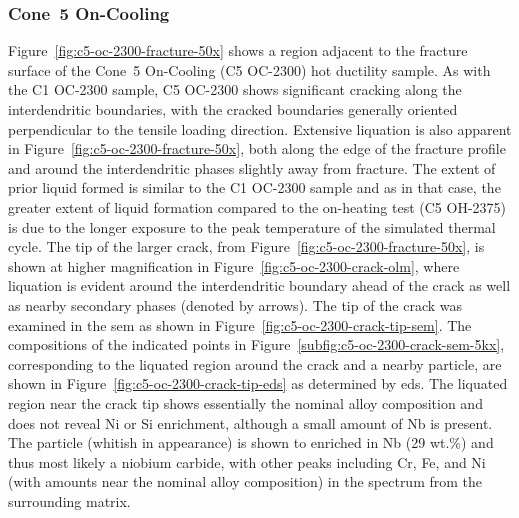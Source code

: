 {\subsubsection{Cone~5 On-Cooling}
Figure~\ref{fig:c5-oc-2300-fracture-50x} shows a region adjacent to the fracture surface of the Cone~5 On-Cooling  (C5 OC-2300) hot ductility sample. As with the C1 OC-2300 sample, C5 OC-2300 shows significant cracking along the interdendritic boundaries, with the cracked boundaries generally oriented perpendicular to the tensile loading direction. Extensive liquation is also apparent in Figure~\ref{fig:c5-oc-2300-fracture-50x}, both along the edge of the fracture profile and around the interdendritic phases slightly away from fracture. The extent of prior liquid formed is similar to the C1 OC-2300 sample and as in that case, the greater extent of liquid formation compared to the on-heating test (C5 OH-2375) is due to the longer exposure to the peak temperature of the simulated thermal cycle. The tip of the larger crack, from Figure~\ref{fig:c5-oc-2300-fracture-50x}, is shown at higher magnification in Figure~\ref{fig:c5-oc-2300-crack-olm}, where liquation is evident around the interdendritic boundary ahead of the crack as well as nearby secondary phases (denoted by arrows). The tip of the crack was examined in the \gls{sem} as shown in Figure~\ref{fig:c5-oc-2300-crack-tip-sem}. The compositions of the indicated points in Figure~\ref{subfig:c5-oc-2300-crack-sem-5kx}, corresponding to the liquated region around the crack and a nearby particle, are shown in Figure~\ref{fig:c5-oc-2300-crack-tip-eds} as determined by \gls{eds}. The liquated region near the crack tip shows essentially the nominal alloy composition and does not reveal Ni or Si enrichment, although a small amount of Nb is present. The particle (whitish in appearance) is shown to enriched in Nb (29 wt.\%) and thus most likely a niobium carbide, with other peaks including Cr, Fe, and Ni (with amounts near the nominal alloy composition) in the spectrum from the surrounding matrix.

}
